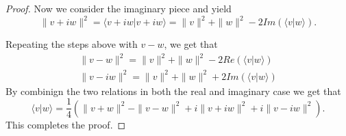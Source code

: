 \documentclass[11pt]{amsart}
\theoremstyle{definition}
\numberwithin{theorem}{section}
\numberwithin{definition}{section}
\numberwithin{equation}{section}
\begin{document}
{{{{\begin{proof}
  	 	Now we consider the imaginary piece and yield
  	 	\begin{equation*}
  	 		\|v + iw\|^2 = \langle v + iw|v+iw\rangle = \|v\|^2 + \|w\|^2 - 2Im(\langle v | w \rangle).
  	 	\end{equation*}

  	 	Repeating the steps above with $v -w$, we get that
  	 	\begin{equation*}
  	 	\begin{aligned}
  	 	  	 		\|v -w\|^2 = \|v\|^2 + \|w\|^2 - 2Re(\langle v|w\rangle) 	\\
	 	  	 		\|v - iw\|^2 = \|v\|^2 + \|w\|^2 + 2Im(\langle v|w\rangle) 		
  	 	 	\end{aligned} 	
  	 	\end{equation*}
  	 	By combinign the two relations in both the real and imaginary case we get that
  	 	\begin{equation*}
  	 		\langle v | w \rangle = \frac{1}{4}\left( \|v + w\|^2 - \|v - w\|^2 + i\|v+iw\|^2 + i\|v-iw\|^2\right).
  	 	\end{equation*}
  	 	This completes the proof.
  	\end{proof} 	
 \medskip {}}}}}
\end{document}
